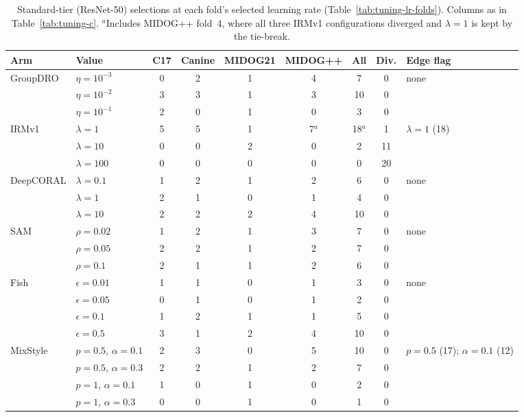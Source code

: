 \begin{table}[width=\linewidth,pos=p]
\caption{Standard-tier (ResNet-50) selections at each fold's selected learning
rate (Table~\ref{tab:tuning-lr-folds}). Columns as in
Table~\ref{tab:tuning-c}. $^{a}$Includes MIDOG++ fold~4, where all three IRMv1
configurations diverged and $\lambda=1$ is kept by the tie-break.}
\label{tab:tuning-s}
\footnotesize
\begin{tabular*}{\tblwidth}{@{\extracolsep{\fill}}ll*{6}{c}>{\raggedright\arraybackslash}p{3.6cm}@{}}
\toprule
Arm & Value & C17 & Canine & MIDOG21 & MIDOG++ & All & Div. & Edge flag \\
\midrule
GroupDRO & $\eta{=}10^{-3}$ & 0 & 2 & 1 & 4 & 7 & 0 & none \\
 & $\eta{=}10^{-2}$ & 3 & 3 & 1 & 3 & 10 & 0 &  \\
 & $\eta{=}10^{-1}$ & 2 & 0 & 1 & 0 & 3 & 0 &  \\
\addlinespace
IRMv1 & $\lambda{=}1$ & 5 & 5 & 1 & 7$^{a}$ & 18$^{a}$ & 1 & $\lambda{=}1$ (18) \\
 & $\lambda{=}10$ & 0 & 0 & 2 & 0 & 2 & 11 &  \\
 & $\lambda{=}100$ & 0 & 0 & 0 & 0 & 0 & 20 &  \\
\addlinespace
DeepCORAL & $\lambda{=}0.1$ & 1 & 2 & 1 & 2 & 6 & 0 & none \\
 & $\lambda{=}1$ & 2 & 1 & 0 & 1 & 4 & 0 &  \\
 & $\lambda{=}10$ & 2 & 2 & 2 & 4 & 10 & 0 &  \\
\addlinespace
SAM & $\rho{=}0.02$ & 1 & 2 & 1 & 3 & 7 & 0 & none \\
 & $\rho{=}0.05$ & 2 & 2 & 1 & 2 & 7 & 0 &  \\
 & $\rho{=}0.1$ & 2 & 1 & 1 & 2 & 6 & 0 &  \\
\addlinespace
Fish & $\epsilon{=}0.01$ & 1 & 1 & 0 & 1 & 3 & 0 & none \\
 & $\epsilon{=}0.05$ & 0 & 1 & 0 & 1 & 2 & 0 &  \\
 & $\epsilon{=}0.1$ & 1 & 2 & 1 & 1 & 5 & 0 &  \\
 & $\epsilon{=}0.5$ & 3 & 1 & 2 & 4 & 10 & 0 &  \\
\addlinespace
MixStyle & $p{=}0.5$, $\alpha{=}0.1$ & 2 & 3 & 0 & 5 & 10 & 0 & $p{=}0.5$ (17); $\alpha{=}0.1$ (12) \\
 & $p{=}0.5$, $\alpha{=}0.3$ & 2 & 2 & 1 & 2 & 7 & 0 &  \\
 & $p{=}1$, $\alpha{=}0.1$ & 1 & 0 & 1 & 0 & 2 & 0 &  \\
 & $p{=}1$, $\alpha{=}0.3$ & 0 & 0 & 1 & 0 & 1 & 0 &  \\

\end{tabular*}
\end{table}
